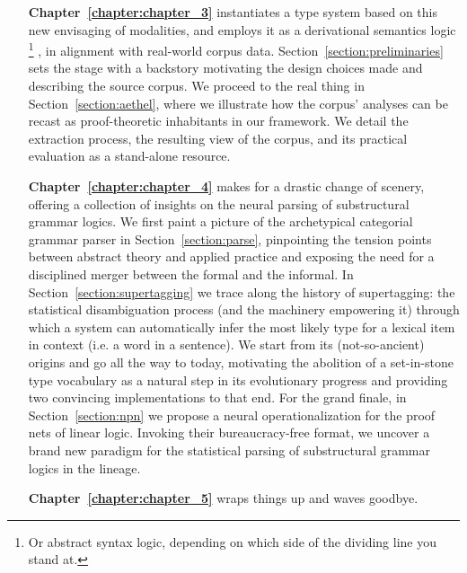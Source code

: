 {\begin{enumerate}[labelindent=2pt, itemindent=30pt, labelsep=5pt, widest=Chapter III,align=right,itemsep=5pt]
Unsatisfied by the comparison, we move on to Section~\ref{section:modalities_for_dependency}, where we appropriate the modalities we resorted to earlier, repurposing them now as dependency domain demarcators.
\item[\textbf{Chapter~\ref{chapter:chapter_3}}] instantiates a type system based on this new envisaging of modalities, and employs it as a derivational semantics logic%
	\footnote{Or abstract syntax logic, depending on which side of the dividing line you stand at.}%
, in alignment with real-world corpus data. 
Section~\ref{section:preliminaries} sets the stage with a backstory motivating the design choices made and describing the source corpus.
We proceed to the real thing in Section~\ref{section:aethel}, where we illustrate how the corpus' analyses can be recast as proof-theoretic inhabitants in our framework.
We detail the extraction process, the resulting view of the corpus, and its practical evaluation as a stand-alone resource.
\item[\textbf{Chapter~\ref{chapter:chapter_4}}] makes for a drastic change of scenery, offering a collection of insights on the neural parsing of substructural grammar logics.
We first paint a picture of the archetypical categorial grammar parser in Section~\ref{section:parse}, pinpointing the tension points between abstract theory and applied practice and exposing the need for a disciplined merger between the formal and the informal.
In Section~\ref{section:supertagging} we trace along the history of supertagging: the statistical disambiguation process (and the machinery empowering it) through which a system can automatically infer the most likely type for a lexical item in context (i.e. a word in a sentence).
We start from its (not-so-ancient) origins and go all the way to today, motivating the abolition of a set-in-stone type vocabulary as a natural step in its evolutionary progress and providing two convincing implementations to that end.
For the grand finale, in Section~\ref{section:npn} we propose a neural operationalization for the proof nets of linear logic.
Invoking their bureaucracy-free format, we uncover a brand new paradigm for the statistical parsing of substructural grammar logics in the  lineage.
\item[\textbf{Chapter~\ref{chapter:chapter_5}}] wraps things up and waves  goodbye.
\end{enumerate}

}
